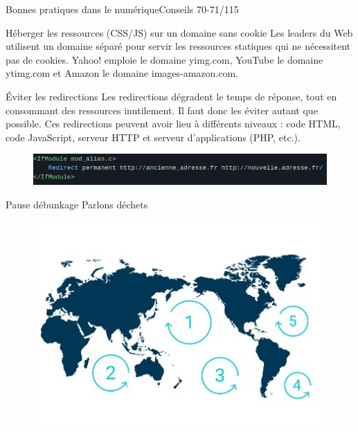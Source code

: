 \begin{frame}{Bonnes pratiques dans le numérique}{Conseils 70-71/115}

\begin{block}{Héberger les ressources (CSS/JS) sur un domaine sans cookie}
Les leaders du Web utilisent un domaine séparé pour servir les ressources statiques qui ne nécessitent pas de cookies. Yahoo! emploie le domaine yimg.com, YouTube le domaine ytimg.com et Amazon le domaine images-amazon.com.
\end{block}

\begin{block}{Éviter les redirections}
Les redirections dégradent le temps de réponse, tout en consommant des ressources inutilement. Il faut donc les éviter autant que possible. Ces redirections peuvent avoir lieu à différents niveaux : code HTML, code JavaScript, serveur HTTP et serveur d’applications (PHP, etc.).
\begin{figure}
    \centering
    \includegraphics[scale=0.4]{chapitre2/wdd6/fig/c2.png}
\end{figure}
\end{block}

\end{frame}


\begin{frame}{Pause débunkage }{Parlons déchets}
\begin{figure}
    \centering
    \includegraphics[scale=0.85]{chapitre2/wdd6/fig/carte.jpg}
\end{figure}
\end{frame}